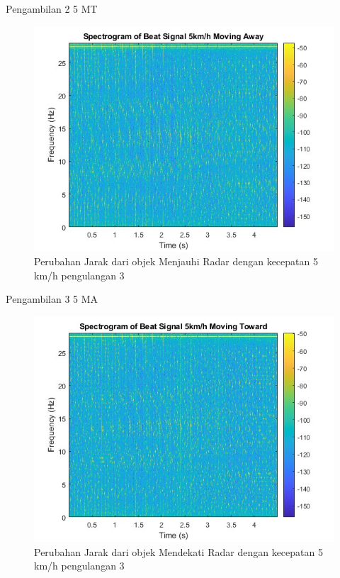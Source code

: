 Pengambilan 2 5 MT

\begin{figure}
	\centering
	\includegraphics[scale=0.6]{pics/bab5/Velocity/3_5MA.jpg}
	\caption{Perubahan Jarak dari objek Menjauhi Radar dengan kecepatan 5 km/h pengulangan 3}
	\label{fig:pengambilan3_5MA}
\end{figure}

Pengambilan 3 5 MA

\begin{figure}
	\centering
	\includegraphics[scale=0.6]{pics/bab5/Velocity/1_5MT.jpg}
	\caption{Perubahan Jarak dari objek Mendekati Radar dengan kecepatan 5 km/h pengulangan 3}
	\label{fig:pengambilan3_5MT}
\end{figure}

